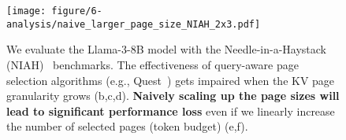 \begin{figure}[t]
    \centering
    \texttt{[image: figure/6-analysis/naive\_larger\_page\_size\_NIAH\_2x3.pdf]}
    \caption{We evaluate the Llama-3-8B model with the Needle-in-a-Haystack (NIAH)~\cite{LLMTest_NeedleInAHaystack} benchmarks. The effectiveness of query-aware page selection algorithms (e.g., Quest~\cite{tang2024quest}) gets impaired when the KV page granularity grows (b,c,d). \textbf{Naively scaling up the page sizes will lead to significant performance loss} even if we linearly increase the number of selected pages (token budget) (e,f). }
    \label{fig:ana:naive-larger-page}
\end{figure}
